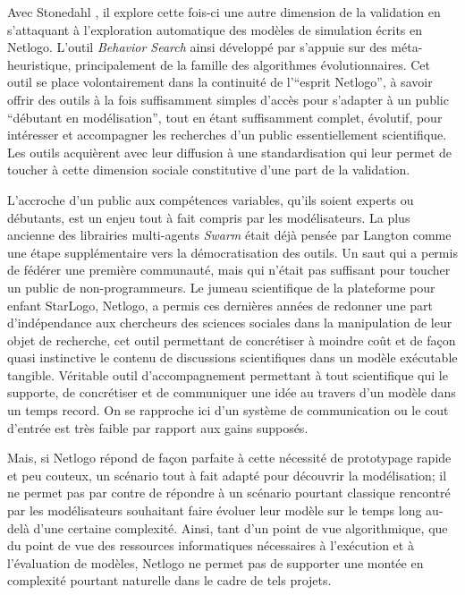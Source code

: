 Avec Stonedahl \autocites{Stonedahl2011, Stonedahl2011b, Stonedahl2010}, il explore cette fois-ci une autre dimension de la validation en s'attaquant à l'exploration automatique des modèles de simulation écrits en Netlogo. L'outil \textit{Behavior Search} ainsi développé par \textcite{Stonedahl2011a} s'appuie sur des méta-heuristique, principalement de la famille des algorithmes évolutionnaires. Cet outil se place volontairement dans la continuité de l'\enquote{esprit Netlogo}, à savoir offrir des outils à la fois suffisamment simples d'accès pour s'adapter à un public \enquote{débutant en modélisation}, tout en étant suffisamment complet, évolutif, pour intéresser et accompagner les recherches d'un public essentiellement scientifique. Les outils acquièrent avec leur diffusion à une standardisation qui leur permet de toucher à cette dimension sociale constitutive d'une part de la validation.

L'accroche d'un public aux compétences variables, qu'ils soient experts ou débutants, est un enjeu tout à fait compris par les modélisateurs. La plus ancienne des librairies multi-agents \textit{Swarm} était déjà pensée par Langton comme une étape supplémentaire vers la démocratisation des outils. Un saut qui a permis de fédérer une première communauté, mais qui n'était pas suffisant pour toucher un public de non-programmeurs. Le jumeau scientifique de la plateforme pour enfant StarLogo, Netlogo, a permis ces dernières années de redonner une part d'indépendance aux chercheurs des sciences sociales dans la manipulation de leur objet de recherche, cet outil permettant de concrétiser à moindre coût et de façon quasi instinctive le contenu de discussions scientifiques dans un modèle exécutable tangible. Véritable outil d'accompagnement permettant à tout scientifique qui le supporte, de concrétiser et de communiquer une idée au travers d'un modèle dans un temps record. On se rapproche ici d'un système de communication ou le cout d'entrée est très faible par rapport aux gains supposés. 

Mais, si Netlogo répond de façon parfaite à cette nécessité de prototypage rapide et peu couteux, un scénario tout à fait adapté pour découvrir la modélisation; il ne permet pas par contre de répondre à un scénario pourtant classique rencontré par les modélisateurs souhaitant faire évoluer leur modèle sur le temps long au-delà d'une certaine complexité. Ainsi, tant d'un point de vue algorithmique, que du point de vue des ressources informatiques nécessaires à l'exécution et à l'évaluation de modèles, Netlogo ne permet pas de supporter une montée en complexité pourtant naturelle dans le cadre de tels projets. 

